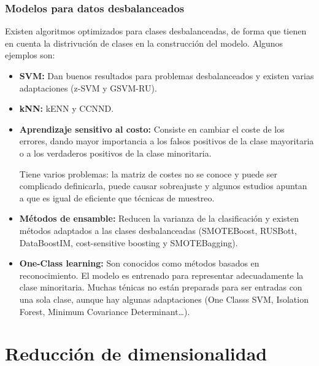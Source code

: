 \documentclass[12pt, letterpaper]{article}
\begin{document}
\subsubsection{Modelos para datos desbalanceados}
Existen algoritmos optimizados para clases desbalanceadas, de forma que tienen en cuenta la distrivución de clases en la construcción del modelo. Algunos ejemplos son:
\begin{itemize}
    \item \textbf{SVM:} Dan buenos resultados para problemas desbalanceados y existen varias adaptaciones (z-SVM y GSVM-RU).
    \item \textbf{kNN:} kENN y CCNND.\@
    \item \textbf{Aprendizaje sensitivo al costo:} Consiste en cambiar el coste de los errores, dando mayor importancia a los falsos positivos de la clase mayoritaria o a los verdaderos positivos de la clase minoritaria. 
    
    Tiene varios problemas: la matriz de costes no se conoce y puede ser complicado definicarla, puede causar sobreajuste y algunos estudios apuntan a que es igual de eficiente que técnicas de muestreo.

    \item \textbf{Métodos de ensamble:} Reducen la varianza de la clasificación y existen métodos adaptados a las clases desbalanceadas (SMOTEBoost, RUSBott, DataBoostIM, cost-sensitive boosting y SMOTEBagging).
    \item \textbf{One-Class learning:} Son conocidos como métodos basados en reconocimiento. El modelo es entrenado para representar adecuadamente la clase minoritaria. Muchas ténicas no están preparads para ser entradas con una sola clase, aunque hay algunas adaptaciones (One Classs SVM, Isolation Forest, Minimum Covariance Determinant\dots).
\end{itemize}

\newpage
\section{Reducción de dimensionalidad}
\end{document}

